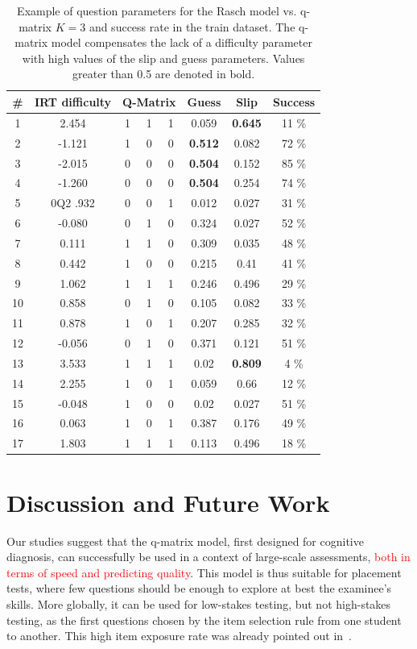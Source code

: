 \documentclass{sig-alternate}
\newcommand\alert[1]{\textcolor{red}{#1}}
\begin{document}
\begin{table}
\small\centering\begin{tabular}{c|c|ccccc|c}
\# & IRT difficulty & 	\multicolumn{3}{c}{Q-Matrix} & Guess & Slip & Success\\
\hline
1 & 2.454 & 	1 & 1 & 1 & 0.059 & \textbf{0.645} & 11 \% \\
2 & -1.121 & 	1 & 0 & 0 & \textbf{0.512} & 0.082 & 72 \% \\
3 & -2.015 & 	0 & 0 & 0 & \textbf{0.504} & 0.152 & 85 \% \\
4 & -1.260 & 	0 & 0 & 0 & \textbf{0.504} & 0.254 & 74 \% \\
5 & 0Q2 .932 & 	0 & 0 & 1 & 0.012 & 0.027 & 31 \% \\
6 & -0.080 & 	0 & 1 & 0 & 0.324 & 0.027 & 52 \% \\
7 & 0.111 & 	1 & 1 & 0 & 0.309 & 0.035 & 48 \% \\
8 & 0.442 & 	1 & 0 & 0 & 0.215 & 0.41 & 41 \% \\
9 & 1.062 & 	1 & 1 & 1 & 0.246 & 0.496 & 29 \% \\
10 & 0.858 & 	0 & 1 & 0 & 0.105 & 0.082 & 33 \% \\
11 & 0.878 & 	1 & 0 & 1 & 0.207 & 0.285 & 32 \% \\
12 & -0.056 & 	0 & 1 & 0 & 0.371 & 0.121 & 51 \% \\
13 & 3.533 & 	1 & 1 & 1 & 0.02 & \textbf{0.809} & 4 \% \\
14 & 2.255 & 	1 & 0 & 1 & 0.059 & 0.66 & 12 \% \\
15 & -0.048 & 	1 & 0 & 0 & 0.02 & 0.027 & 51 \% \\
16 & 0.063 & 	1 & 0 & 1 & 0.387 & 0.176 & 49 \% \\
17 & 1.803 & 	1 & 1 & 1 & 0.113 & 0.496 & 18 \%
\end{tabular}
\caption{Example of question parameters for the Rasch model vs. q-matrix $K = 3$ and success rate in the train dataset. The q-matrix model compensates the lack of a difficulty parameter with high values of the slip and guess parameters. Values greater than 0.5 are denoted in bold.}
\label{tab:example}
\end{table}

\section{Discussion and Future Work}

Our studies suggest that the q-matrix model, first designed for cognitive diagnosis, can successfully be used in a context of large-scale assessments, \alert{both in terms of speed and predicting quality}. This model is thus suitable for placement tests, where few questions should be enough to explore at best the examinee's skills. More globally, it can be used for low-stakes testing, but not high-stakes testing, as the first questions chosen by the item selection rule from one student to another. This high item exposure rate was already pointed out in~\cite{Cheng2009}.
\end{document}
